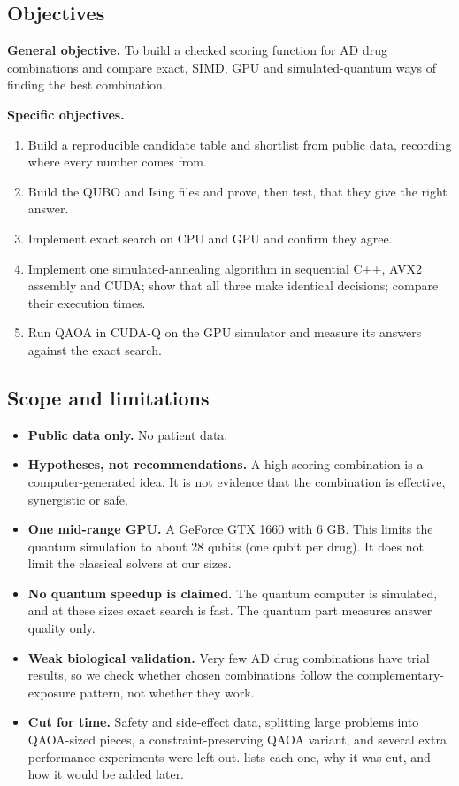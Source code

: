 \subsection{Objectives}

\textbf{General objective.} To build a checked scoring function for AD drug combinations and compare exact, SIMD, GPU and simulated-quantum ways of finding the best combination.

\textbf{Specific objectives.}
\begin{enumerate}
\item Build a reproducible candidate table and shortlist from public data, recording where every number comes from.
\item Build the QUBO and Ising files and prove, then test, that they give the right answer.
\item Implement exact search on CPU and GPU and confirm they agree.
\item Implement one simulated-annealing algorithm in sequential C++, AVX2 assembly and CUDA; show that all three make identical decisions; compare their execution times.
\item Run QAOA in CUDA-Q on the GPU simulator and measure its answers against the exact search.
\end{enumerate}

\subsection{Scope and limitations}

\begin{itemize}
\item \textbf{Public data only.} No patient data.
\item \textbf{Hypotheses, not recommendations.} A high-scoring combination is a computer-generated idea. It is not evidence that the combination is effective, synergistic or safe.
\item \textbf{One mid-range GPU.} A GeForce GTX 1660 with 6 GB. This limits the quantum simulation to about 28 qubits (one qubit per drug). It does not limit the classical solvers at our sizes.
\item \textbf{No quantum speedup is claimed.} The quantum computer is simulated, and at these sizes exact search is fast. The quantum part measures answer quality only.
\item \textbf{Weak biological validation.} Very few AD drug combinations have trial results, so we check whether chosen combinations follow the complementary-exposure pattern, not whether they work.
\item \textbf{Cut for time.} Safety and side-effect data, splitting large problems into QAOA-sized pieces, a constraint-preserving QAOA variant, and several extra performance experiments were left out.  lists each one, why it was cut, and how it would be added later.
\end{itemize}

